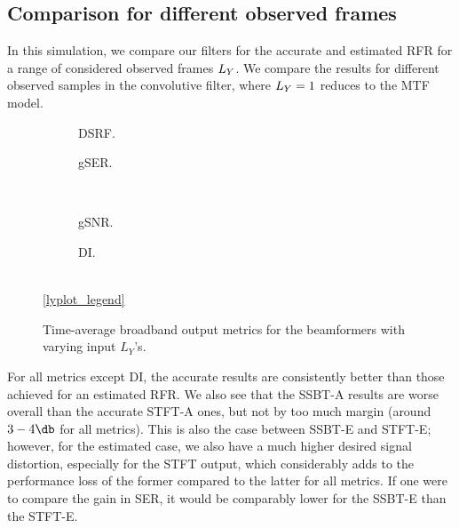 \subsection{Comparison for different observed frames}

In this simulation, we compare our filters for the accurate and estimated RFR for a range of considered observed frames $\Ly$. We compare the results for different observed samples in the convolutive filter, where $\Ly = 1$ reduces to the MTF model.

\begin{figure}[t]
	\centering
	\begin{subfigure}{0.49\textwidth}
		\centering
		
		\caption{DSRF.}
		\label{subfig:lineplot__DSRF__iSER_n15__Ly_var}
	\end{subfigure}\hfill
	\begin{subfigure}{0.49\textwidth}
		\centering
		
		\caption{gSER.}
		\label{subfig:lineplot__gSER__iSER_n15__Ly_var}
	\end{subfigure}\\[1em]
	\begin{subfigure}{0.49\textwidth}
		\centering
		
		\caption{gSNR.}
		\label{subfig:lineplot__gSNR__iSER_n15__Ly_var}
	\end{subfigure}\hfill
	\begin{subfigure}{0.49\textwidth}
		\centering
		
		\caption{DI.}
		\label{subfig:lineplot__DI__iSER_n15__Ly_var}
	\end{subfigure}\\[1em]
	\ref*{lyplot_legend}
	\caption{Time-average broadband output metrics for the beamformers with varying input $L_Y$'s.}
	\label{fig:lineplot__iSER_n15__Ly_var}
\end{figure}

For all metrics except DI, the accurate results are consistently better than those achieved for an estimated RFR. We also see that the SSBT-A results are worse overall than the accurate STFT-A ones, but not by too much margin (around $3-4\dB$ for all metrics). This is also the case between SSBT-E and STFT-E; however, for the estimated case, we also have a much higher desired signal distortion, especially for the STFT output, which considerably adds to the performance loss of the former compared to the latter for all metrics. If one were to compare the gain in SER, it would be comparably lower for the SSBT-E than the STFT-E.

